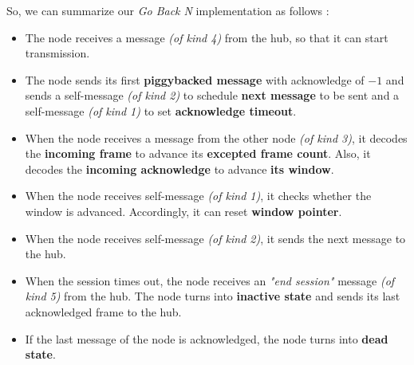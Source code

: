 So, we can summarize our \emph{Go Back N} implementation as follows :
\begin{itemize}
    \item The node receives a message \emph{(of kind 4)} from the hub, so that it can start transmission.
    \item The node sends its first \textbf{piggybacked message} with acknowledge of $-1$ and sends a self-message \emph{(of kind 2)} to schedule \textbf{next message} to be sent and a self-message \emph{(of kind 1)} to set \textbf{acknowledge timeout}.
    \item When the node receives a message from the other node \emph{(of kind 3)}, it decodes the \textbf{incoming frame} to advance its \textbf{excepted frame count}. Also, it decodes the \textbf{incoming acknowledge} to advance \textbf{its window}.
    \item When the node receives self-message \emph{(of kind 1)}, it checks whether the window is advanced. Accordingly, it can reset \textbf{window pointer}.
    \item When the node receives self-message \emph{(of kind 2)}, it sends the next message to the hub.
    \item When the session times out, the node receives an \textit{"end session"} message \emph{(of kind 5)} from the hub. The node turns into \textbf{inactive state} and sends its last acknowledged frame to the hub.
    \item If the last message of the node is acknowledged, the node turns into \textbf{dead state}.
\end{itemize}

